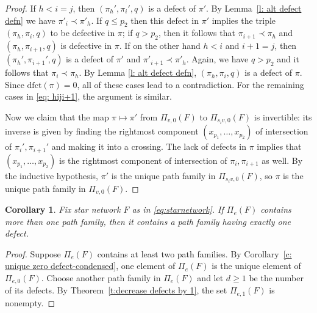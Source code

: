 \documentclass[12pt]{amsart}
\newtheorem{cor}[thm]{Corollary}
\newtheorem{lem}[thm]{Lemma}
\theoremstyle{definition}
\numberwithin{equation}{section}
\newcommand{\dfct}{\mathrm{dfct}}
\newcommand{\ctr}[1]{{x}_{#1}}
\begin{document}
\begin{proof}
    If $h < i = j$, then $(\pi_h', \pi_i', q)$ is a defect of $\pi'$. By Lemma~\ref{l: alt defect defn} we have $\pi'_i \prec \pi'_h$. If $q \leq p_2$ then this defect in $\pi'$ implies the triple $(\pi_h, \pi_i, q)$ to be defective in $\pi$;
    if $q > p_2$, then 
it follows that $\pi_{i+1} \prec \pi_h$ and $(\pi_h, \pi_{i+1}, q)$ is defective in $\pi$.
If on the other hand $h < i$ and $i+1 = j$, then $(\pi_h', \pi_{i+1}', q)$ is a defect of $\pi'$ and $\pi'_{i+1} \prec \pi'_h$. Again, we have $q > p_2$ and it follows that $\pi_{i} \prec \pi_h$. By Lemma \ref{l: alt defect defn}, $(\pi_h, \pi_{i}, q)$ is a defect of $\pi$. Since $\dfct(\pi) = 0$, all of these cases lead to a contradiction. For the remaining cases in \eqref{eq: hiji+1}, the argument is similar.


    Now we claim that the map $\pi \mapsto \pi'$ from $\Pi_{v, 0}(F)$ to $\Pi_{s_iv, 0}(F)$ is invertible:
    its inverse is given by finding the rightmost component $(\ctr{p_1}, \dots, \ctr{p_2})$ of intersection of $\pi_i', \pi_{i+1}'$ and making it into a crossing. The lack of defects in $\pi$ implies that $(\ctr{p_1}, \dots, \ctr{p_2})$ is the rightmost component of intersection of $\pi_i, \pi_{i+1}$ as well. By the inductive hypothesis, $\pi'$ is the unique path family in $\Pi_{s_iv, 0}(F)$, so $\pi$ is the unique path family in $\Pi_{v, 0}(F)$.
\end{proof}

\begin{cor}
\label{c:onedefect-condensed}
    Fix star network $F$ as in \eqref{eq:starnetwork}.
    If $\Pi_e(F)$ contains more than one path family, then it contains a path family having exactly one defect.
\end{cor}
\begin{proof}
    Suppose $\Pi_e(F)$ contains at least two path families.
    By Corollary~\ref{c: unique zero defect-condensed}, one element of $\Pi_e(F)$ %
    is the unique 
    element of $\Pi_{e,0}(F)$.
    Choose another path family in $\Pi_e(F)$ and let $d \geq 1$ be the 
    number of its defects.  By Theorem~\ref{t:decrease defects by 1},
    the set $\Pi_{e,1}(F)$ is nonempty.
\end{proof}
\end{document}
